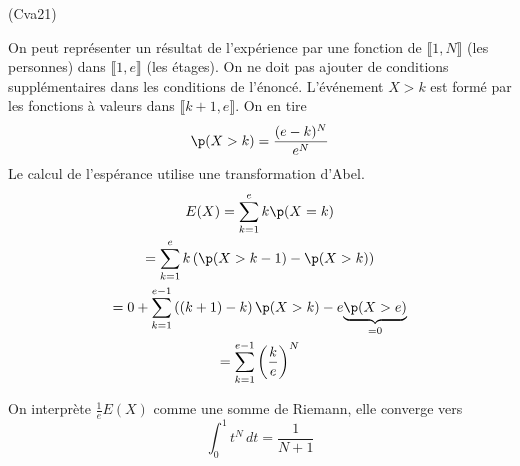 \begin{tiny}(Cva21)\end{tiny} On peut représenter un résultat de l'expérience par une fonction de $\llbracket 1,N\rrbracket$ (les personnes) dans $\llbracket 1,e\rrbracket$ (les étages). On ne doit pas ajouter de conditions supplémentaires dans les conditions de l'énoncé.\newline
L'événement $X>k$ est formé par les fonctions à valeurs dans $\llbracket k+1, e\rrbracket$. On en tire
\begin{displaymath}
  \p(X>k)= \frac{(e-k)^N}{e^N}
\end{displaymath}
Le calcul de l'espérance utilise une transformation d'Abel.
\begin{multline*}
E(X) = \sum_{k=1}^ek\p(X=k)\\
= \sum_{k=1}^e k\left( \p(X>k-1) - \p(X>k)\right) \\
= 0 + \sum_{k=1}^{e-1} \left((k+1)  - k\right) \p(X>k) -e\underset{=0}{\underbrace{\p(X>e)}}\\
= \sum_{k=1}^{e-1}\left(\frac{k}{e} \right)^N 
\end{multline*}

On interprète $\frac{1}{e}E(X)$ comme une somme de Riemann, elle converge vers
\begin{displaymath}
  \int_0^1 t^N\,dt = \frac{1}{N+1}
\end{displaymath}
